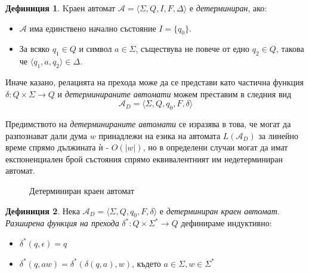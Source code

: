\documentclass[12pt, oneside]{article}
\theoremstyle{definition}
\newtheorem{definition}{Дефиниция}[section]
\begin{document}
\begin{definition}
	Kраен автомат \( \mathcal{A} = \langle \Sigma, Q, I, F, \Delta \rangle \) е \emph{детерминиран}, ако:

	\begin{itemize}
		\item \( \mathcal{A} \) има единствено начално състояние \(I = \{q_0\}\).
		\item За всяко \( q_1 \in Q \) и символ \( a \in \Sigma \), съществува не повече от едно \( q_2 \in Q \), такова че \( \langle q_1, a, q_2 \rangle \in \Delta \).
	\end{itemize} 

	\noindent Иначе казано, релацията на прехода може да се представи като частична функция \( \delta: Q \times \Sigma \to Q \) и \emph{детерминираните автомати} можем преставим в следния вид \[ \mathcal{A}_D = \langle \Sigma, Q, q_0, F, \delta \rangle \]

	Предимството на \emph{детерминираните автомати} се изразява в това, че могат да разпознават дали дума \( w \) принадлежи на езика на автомата \( L(\mathcal{A}_D) \) за линейно време спрямо дължината ѝ - \( O(|w|) \), но в определени случаи могат да имат експоненциален брой състояния спрямо еквивалентният им недетерминиран автомат.
\end{definition}

\begin{figure}[!htb]
	\centering
	
	\caption{Детерминиран краен автомат}
\end{figure}

\begin{definition}
	Нека \( \mathcal{A}_D = \langle \Sigma, Q, q_0, F, \delta \rangle \) е \emph{детерминиран краен автомат}. \emph{Разширена функция на прехода} \( \delta^*: Q \times \Sigma^* \to Q \) дефинираме индуктивно:

	\begin{itemize}
		\item \( \delta^*(q, \epsilon) = q \)
		\item \( \delta^*(q, aw) = \delta^*(\delta(q, a), w) \), където \( a \in \Sigma, w \in \Sigma^* \)
	\end{itemize}
\end{definition}
\end{document}

